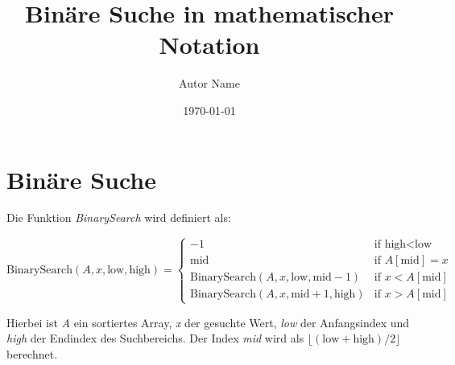 \documentclass{article}
\begin{document}
\title{Binäre Suche in mathematischer Notation}
\author{Autor Name}
\date{\today}

\maketitle

\section{Binäre Suche}

Die Funktion \textit{BinarySearch} wird definiert als:

\[
\text{BinarySearch}(A, x, \text{low}, \text{high}) = 
\begin{cases} 
-1 & \text{if } \text{high} < \text{low} \\
\text{mid} & \text{if } A[\text{mid}] = x \\
\text{BinarySearch}(A, x, \text{low}, \text{mid} - 1) & \text{if } x < A[\text{mid}] \\
\text{BinarySearch}(A, x, \text{mid} + 1, \text{high}) & \text{if } x > A[\text{mid}]
\end{cases}
\]

Hierbei ist \textit{A} ein sortiertes Array, \textit{x} der gesuchte Wert, \textit{low} der Anfangsindex und \textit{high} der Endindex des Suchbereichs. Der Index \textit{mid} wird als $\lfloor (\text{low} + \text{high}) / 2 \rfloor$ berechnet.
\end{document}
